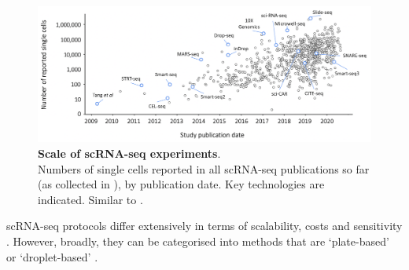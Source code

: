\begin{figure}[h]
\centering
\includegraphics[width=16cm]{Chapter3/Fig/scrnaseq_ncells.png}
\caption[scRNA-seq technologies]{\textbf{Scale of scRNA-seq experiments}.\\
Numbers of single cells reported in all scRNA-seq publications so far (as collected in \cite{svensson2020single}), by publication date.
Key technologies are indicated.
Similar to \cite{svensson2018exponential}.}
\label{fig:scrnaseq_technologies}
\end{figure}



scRNA-seq protocols differ extensively in terms of scalability, costs and sensitivity 
\cite{ziegenhain2017comparative, svensson2018exponential}.
However, broadly, they can be categorised into methods that are 
`plate-based' or `droplet-based'
.\\

